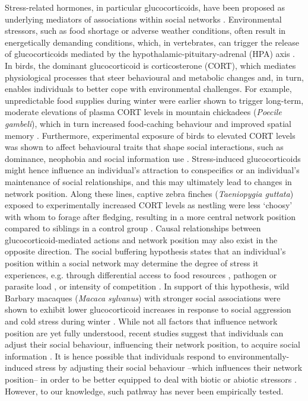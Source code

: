 \documentclass[10pt, twoside]{book} %
\begin{document}
Stress-related hormones, in particular glucocorticoids, have been proposed as underlying mediators of associations within social networks \citep{Boogert2014, Solomon-Lane2015, Brandl2019}. Environmental stressors, such as food shortage or adverse weather conditions, often result in energetically demanding conditions, which, in vertebrates, can trigger the release of glucocorticoids mediated by the hypothalamic-pituitary-adrenal (HPA) axis \citep{Wingfield2013}. In birds, the dominant glucocorticoid is corticosterone (CORT), which mediates physiological processes that steer behavioural and metabolic changes and, in turn, enables individuals to better cope with environmental challenges. For example, unpredictable food supplies during winter were earlier shown to trigger long-term, moderate elevations of plasma CORT levels in mountain chickadees (\textit{Poecile gambeli}), which in turn increased food-caching behaviour and improved spatial memory \citep{Pravosudov2001, Pravosudov2003a}. Furthermore, experimental exposure of birds to elevated CORT levels was shown to affect behavioural traits that shape social interactions, such as dominance, neophobia \citep{Spencer2007} and social information use \citep{Boogert2013}. Stress-induced glucocorticoids might hence influence an individual's attraction to conspecifics or an individual's maintenance of social relationships, and this may ultimately lead to changes in network position. Along these lines, captive zebra finches (\textit{Taeniopygia guttata}) exposed to experimentally increased CORT levels as nestling were less `choosy' with whom to forage after fledging, resulting in a more central network position compared to siblings in a control group \citep{Boogert2014}. Causal relationships between glucocorticoid-mediated actions and network position may also exist in the opposite direction. The social buffering hypothesis states that an individual's position within a social network may determine the degree of stress it experiences, e.g. through differential access to food resources \citep{Webster2013}, pathogen or parasite load \citep{Bull2012, MacIntosh2012}, or intensity of competition \citep{Oh2010, Fisher2016}. In support of this hypothesis, wild Barbary macaques (\textit{Macaca sylvanus}) with stronger social associations were shown to exhibit lower glucocorticoid increases in response to social aggression and cold stress during winter \citep{Young2014}. While not all factors that influence network position are yet fully understood, recent studies suggest that individuals can adjust their social behaviour, influencing their network position, to acquire social information \citep{Kulahci2018, Kulahci2019}. It is hence possible that individuals respond to environmentally-induced stress by adjusting their social behaviour --which influences their network position-- in order to be better equipped to deal with biotic or abiotic stressors \citep{Croft2016}. However, to our knowledge, such pathway has never been empirically tested.\\
\end{document}
